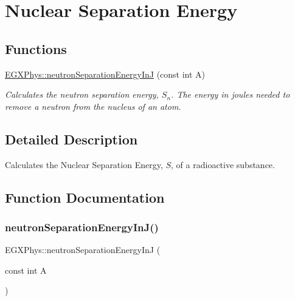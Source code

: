 \hypertarget{group___nuclear_separation_energy}{}\section{Nuclear Separation Energy}
\label{group___nuclear_separation_energy}
\subsection*{Functions}
\begin{DoxyCompactItemize}
\item 
\hyperlink{group___nuclear_separation_energy_ga2a5d74c0ab6645fa7860541e826897b6}{E\+G\+X\+Phys\+::neutron\+Separation\+Energy\+InJ} (const int A)
\begin{DoxyCompactList}\small\item\em Calculates the neutron separation energy, $S_{n}$. The energy in joules needed to remove a neutron from the nucleus of an atom. \end{DoxyCompactList}\end{DoxyCompactItemize}


\subsection{Detailed Description}
Calculates the Nuclear Separation Energy, $S$, of a radioactive substance. 

\subsection{Function Documentation}
\mbox{\label{group___nuclear_separation_energy_ga2a5d74c0ab6645fa7860541e826897b6}} 
\subsubsection{\texorpdfstring{neutron\+Separation\+Energy\+In\+J()}{neutronSeparationEnergyInJ()}}
{\footnotesize\ttfamily E\+G\+X\+Phys\+::neutron\+Separation\+Energy\+InJ (\begin{DoxyParamCaption}\item[{const int}]{A }\end{DoxyParamCaption})}



